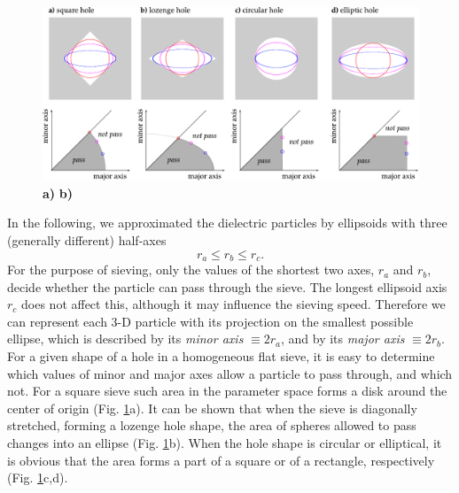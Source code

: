\begin{figure}[h] \caption{\textbf{a)} \textbf{b)} } \label{fg_sieve_pass_notpass} \centering 
\includegraphics[width=\textwidth]{img/technology/sieve_pass_notpass.pdf}
\end{figure}
In the following, we approximated the dielectric particles by ellipsoids with three (generally different) half-axes $$r_a \leq r_b \leq r_c.$$ For the purpose of sieving, only the values of the shortest two axes, $r_a$ and $r_b$, decide whether the particle can pass through the sieve. The longest ellipsoid axis $r_c$ does not affect this, although it may influence the sieving speed. Therefore we can represent each 3-D particle with its projection on the smallest possible ellipse, which is described by its \textit{minor axis} $\equiv 2r_a$, and by its \textit{major axis} $\equiv 2r_b$. For a given shape of a hole in a homogeneous flat sieve, it is easy to determine which values of minor and major axes allow a particle to pass through, and which not. For a square sieve such area in the parameter space forms a disk around the center of origin (Fig. \ref{fg_sieve_pass_notpass}a). It can be shown that when the sieve is diagonally stretched, forming a lozenge hole shape, the area of spheres allowed to pass changes into an ellipse (Fig. \ref{fg_sieve_pass_notpass}b). When the hole shape is circular or elliptical, it is obvious that the area forms a part of a square or of a rectangle, respectively  (Fig. \ref{fg_sieve_pass_notpass}c,d).


